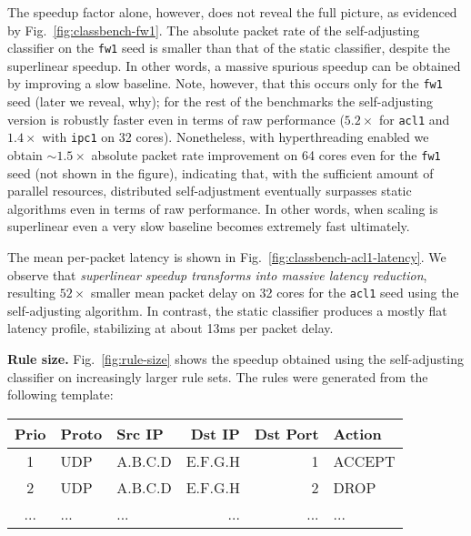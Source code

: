 The speedup factor alone, however, does not reveal the full picture, as evidenced by Fig.~\ref{fig:classbench-fw1}. The absolute packet rate of the self-adjusting classifier on the \texttt{fw1} seed is smaller than that of the static classifier, despite the superlinear speedup. In other words, a massive spurious speedup can be obtained by improving a slow baseline.  Note, however, that this occurs only for the \texttt{fw1} seed (later we reveal, why); for the rest of the benchmarks the self-adjusting version is robustly faster even in terms of raw performance ($5.2\times$ for \texttt{acl1} and $1.4\times$ with \texttt{ipc1} on 32 cores). Nonetheless, with hyperthreading enabled we obtain $\sim\!1.5\times$ absolute packet rate improvement on 64 cores even for the \texttt{fw1} seed (not shown in the figure), indicating that, with the sufficient amount of parallel resources, distributed self-adjustment eventually surpasses static algorithms even in terms of raw performance. In other words, when scaling is superlinear even a very slow baseline becomes extremely fast ultimately.

The mean per-packet latency is shown in Fig.~\ref{fig:classbench-acl1-latency}. We observe that \emph{superlinear speedup transforms into massive latency reduction}, resulting $52\times$ smaller mean packet delay on 32 cores for the \texttt{acl1} seed using the self-adjusting algorithm. In contrast, the static \nftables classifier produces a mostly flat latency profile, stabilizing at about 13ms per packet delay.

\noindent
\textbf{Rule size.} %
Fig.~\ref{fig:rule-size} shows the speedup obtained using the self-adjusting classifier on increasingly larger rule sets. The rules were generated from the following template: 

\noindent %
\begin{small}
  \addtolength{\tabcolsep}{-1pt}    
  \begin{tabular}{c|l|l|r|r|l}
    \textbf{Prio} & \textbf{Proto} & \textbf{Src IP} & \textbf{Dst IP} & \textbf{Dst Port} & \textbf{Action}\\
    \hline
    1 & UDP & A.B.C.D   & E.F.G.H  & 1  & ACCEPT\\
    2 & UDP & A.B.C.D   & E.F.G.H  & 2  & DROP\\
    ... & ... & ...   & ...  & ...  & ...\\
  \end{tabular}
  \addtolength{\tabcolsep}{1pt}
\end{small}

